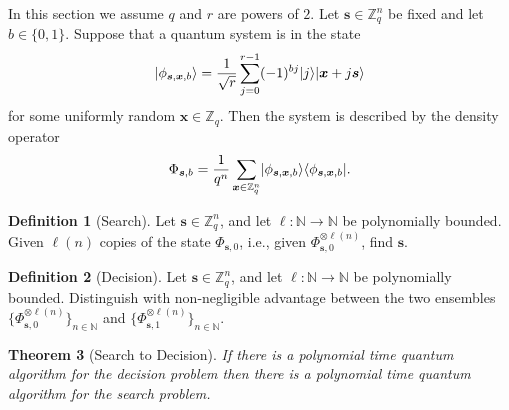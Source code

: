 \documentclass[11pt]{article}
\theoremstyle{plain}
\newtheorem{theorem}{Theorem}
\theoremstyle{definition}
\newtheorem{definition}[theorem]{Definition}
\DeclarePairedDelimiter{\ldbrac}{\lvert}{\rangle}
\DeclarePairedDelimiter{\rdbrac}{\langle}{\rvert}
\def\N{\ensuremath{\mathbb{N}}}
\def\Z{\ensuremath{\mathbb{Z}}}
\begin{document}
In this section we assume $q$ and $r$ are powers of $2$. Let $\bm{s} \in \Z_q^n$ be fixed and let $b \in \{ 0, 1 \}$. Suppose that a quantum system is in the state 
\[ \ldbrac{\phi_{\bm{s}, \bm{x}, b}} = \frac{1}{\sqrt{r}} \sum_{j = 0}^{r - 1} (-1)^{bj}\ldbrac{j}\ldbrac{\bm{x} + j\bm{s}} \]
for some uniformly random $\bm{x} \in \Z_q$. Then the  system is described by the density operator  
\[ \Phi_{\bm{s}, b} = \frac{1}{q^n} \sum_{\bm{x} \in \Z_q^n} \ldbrac{\phi_{\bm{s}, \bm{x}, b}} \rdbrac{\phi_{\bm{s}, \bm{x}, b}}. \]
\begin{definition}[Search]
    Let $\bm{s} \in \Z_q^n$, and let $\ell: \N \rightarrow \N$ be polynomially bounded. Given $\ell(n)$ copies of the state $\Phi_{\bm{s}, 0}$, i.e., given $\Phi_{\bm{s}, 0}^{\otimes \ell(n)}$, find $\bm{s}$.
\end{definition}
\begin{definition}[Decision]
    Let $\bm{s} \in \Z_q^n$, and let $\ell: \N \rightarrow \N$ be polynomially bounded. Distinguish with non-negligible advantage between the two ensembles $\{ \Phi_{\bm{s}, 0}^{\otimes \ell(n)} \}_{n \in \N}$ and $\{ \Phi_{\bm{s}, 1}^{\otimes \ell(n)} \}_{n \in \N}$.
\end{definition}
\begin{theorem}[Search to Decision]
    If there is a polynomial time quantum algorithm for the decision problem then there is a polynomial time quantum algorithm for the search problem.
\end{theorem}
\end{document}
